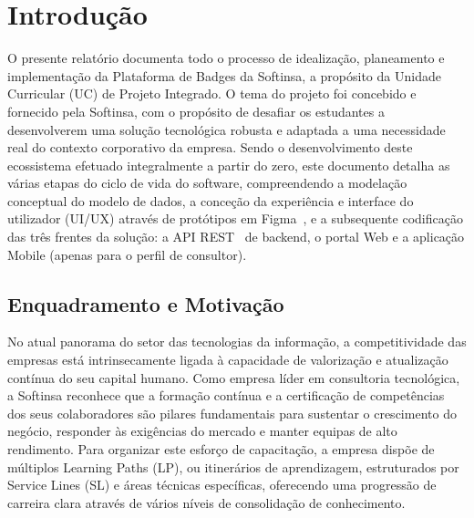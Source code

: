 \documentclass[12pt,a4paper]{report}
\begin{document}
\newpage

\tableofcontents
\newpage
\listoffigures
\newpage
\listoftables
\newpage


\chapter{Introdução}
\label{ch:introducao}

O presente relatório documenta todo o processo de idealização, planeamento e implementação da Plataforma de Badges da Softinsa, a propósito da Unidade Curricular (UC) de Projeto Integrado. O tema do projeto foi concebido e fornecido pela Softinsa, com o propósito de desafiar os estudantes a desenvolverem uma solução tecnológica robusta e adaptada a uma necessidade real do contexto corporativo da empresa. Sendo o desenvolvimento deste ecossistema efetuado integralmente a partir do zero, este documento detalha as várias etapas do ciclo de vida do software, compreendendo a modelação conceptual do modelo de dados, a conceção da experiência e interface do utilizador (UI/UX) através de protótipos em Figma~\cite{figma}, e a subsequente codificação das três frentes da solução: a API REST~\cite{restapi} de backend, o portal Web e a aplicação Mobile (apenas para o perfil de consultor).

\section{Enquadramento e Motivação}

No atual panorama do setor das tecnologias da informação, a competitividade das empresas está intrinsecamente ligada à capacidade de valorização e atualização contínua do seu capital humano. Como empresa líder em consultoria tecnológica, a Softinsa reconhece que a formação contínua e a certificação de competências dos seus colaboradores são pilares fundamentais para sustentar o crescimento do negócio, responder às exigências do mercado e manter equipas de alto rendimento. Para organizar este esforço de capacitação, a empresa dispõe de múltiplos Learning Paths (LP), ou itinerários de aprendizagem, estruturados por Service Lines (SL) e áreas técnicas específicas, oferecendo uma progressão de carreira clara através de vários níveis de consolidação de conhecimento.
\end{document}
